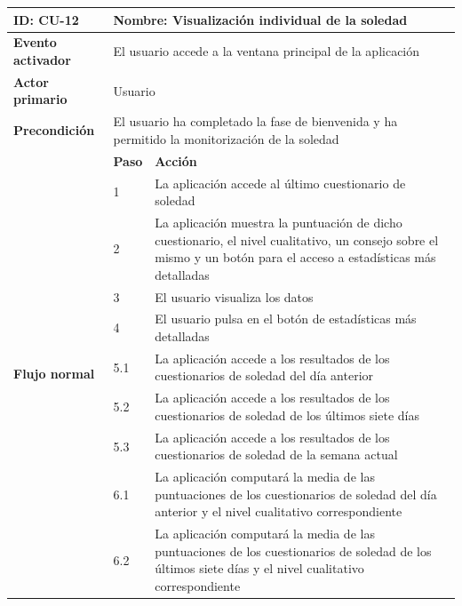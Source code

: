             \begin{table}[h]
                \centering
                \begin{tabularx}{\textwidth}{|l|l|X|}
                    \hline
                    \textbf{ID:} CU-12 & \multicolumn{2}{|X|}{\textbf{Nombre}: Visualización individual de la soledad} \\
                    \hline
                    \textbf{Evento activador} & \multicolumn{2}{|X|}{El usuario accede a la ventana principal de la aplicación} \\
                    \hline
                    \textbf{Actor primario} & \multicolumn{2}{|X|}{Usuario} \\
                    \hline
                    \textbf{Precondición} & \multicolumn{2}{|X|}{El usuario ha completado la fase de bienvenida y ha permitido la monitorización de la soledad} \\
                    \hline
                    \multirow{13}{*}{\textbf{Flujo normal}} & \textbf{Paso} & \textbf{Acción} \\
                    \cline{2-3} & 1 & La aplicación accede al último cuestionario de soledad \\
                    \cline{2-3} & 2 & La aplicación muestra la puntuación de dicho cuestionario, el nivel cualitativo, un consejo sobre el mismo y un botón para el acceso a estadísticas más detalladas \\
                    \cline{2-3} & 3 & El usuario visualiza los datos \\
                    \cline{2-3} & 4 & El usuario pulsa en el botón de estadísticas más detalladas \\
                    \cline{2-3} & 5.1 & La aplicación accede a los resultados de los cuestionarios de soledad del día anterior \\
                    \cline{2-3} & 5.2 & La aplicación accede a los resultados de los cuestionarios de soledad de los últimos siete días \\
                    \cline{2-3} & 5.3 & La aplicación accede a los resultados de los cuestionarios de soledad de la semana actual \\
                    \cline{2-3} & 6.1 & La aplicación computará la media de las puntuaciones de los cuestionarios de soledad del día anterior y el nivel cualitativo correspondiente \\
                    \cline{2-3} & 6.2 & La aplicación computará la media de las puntuaciones de los cuestionarios de soledad de los últimos siete días y el nivel cualitativo correspondiente \\

\end{tabularx}
\end{table}
